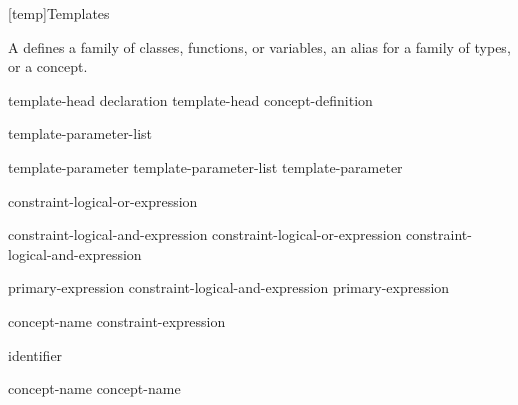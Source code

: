 [temp]{Templates}%


%

\pnum
A  defines a family of classes, functions, or variables,
an alias for a family of types, or a concept.

%
%
\begin{bnf}
\br
  template-head declaration\br
  template-head concept-definition
\end{bnf}

\begin{bnf}
\br
   \terminal{<} template-parameter-list \terminal{>} 
\end{bnf}

\begin{bnf}
\br
  template-parameter\br
  template-parameter-list \terminal{,} template-parameter
\end{bnf}

\begin{bnf}
\br
   constraint-logical-or-expression
\end{bnf}

\begin{bnf}
\br
  constraint-logical-and-expression\br
  constraint-logical-or-expression \terminal{||} constraint-logical-and-expression
\end{bnf}

\begin{bnf}
\br
  primary-expression\br
  constraint-logical-and-expression \terminal{\&\&} primary-expression
\end{bnf}

\begin{bnf}
\br
   concept-name \terminal{=} constraint-expression \terminal{;}
\end{bnf}

\begin{bnf}
\br
  identifier
\end{bnf}

\begin{bnf}
\br
   concept-name\br
   concept-name \terminal{<}  \terminal{>}
\end{bnf}

